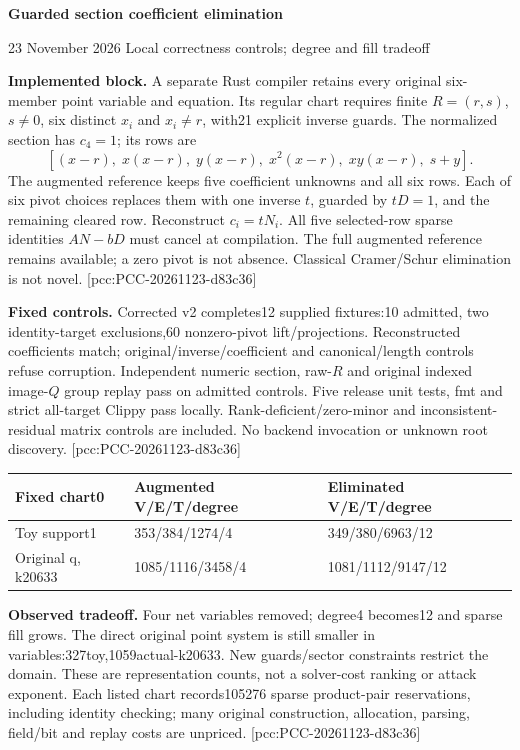 \documentclass[10pt]{article}
\begin{document}
{\Large\bfseries\color{ink} Guarded section coefficient elimination}\par
{\small 23 November 2026 \quad Local correctness controls; degree and fill tradeoff}

\textbf{Implemented block.} A separate Rust compiler retains every original
six-member point variable and equation. Its regular chart requires finite
$R=(r,s)$, $s\ne0$, six distinct $x_i$ and $x_i\ne r$, with21 explicit inverse
guards. The normalized section has $c_4=1$; its rows are
\[
[(x-r),\;x(x-r),\;y(x-r),\;x^2(x-r),\;xy(x-r),\;s+y].
\]
The augmented reference keeps five coefficient unknowns and all six rows.
Each of six pivot choices replaces them with one inverse $t$, guarded by
$tD=1$, and the remaining cleared row. Reconstruct $c_i=tN_i$. All five
selected-row sparse identities $AN-bD$ must cancel at compilation. The full
augmented reference remains available; a zero pivot is not absence.
Classical Cramer/Schur elimination is not novel. [pcc:PCC-20261123-d83c36]

\textbf{Fixed controls.} Corrected v2 completes12 supplied fixtures:10 admitted,
two identity-target exclusions,60 nonzero-pivot lift/projections. Reconstructed
coefficients match; original/inverse/coefficient and canonical/length controls
refuse corruption. Independent numeric section, raw-$R$ and original indexed
image-$Q$ group replay pass on admitted controls. Five release unit tests,
fmt and strict all-target Clippy pass locally. Rank-deficient/zero-minor and
inconsistent-residual matrix controls are included. No backend invocation or
unknown root discovery. [pcc:PCC-20261123-d83c36]

\begin{center}
\begin{tabular}{lll}
\toprule Fixed chart0 & Augmented V/E/T/degree & Eliminated V/E/T/degree\\\midrule
Toy support1 &353/384/1274/4&349/380/6963/12\\
Original q, k20633 &1085/1116/3458/4&1081/1112/9147/12\\\bottomrule
\end{tabular}
\end{center}
\textbf{Observed tradeoff.} Four net variables removed; degree4 becomes12 and
sparse fill grows. The direct original point system is still smaller in
variables:327toy,1059actual-k20633. New guards/sector constraints restrict the
domain. These are representation counts, not a solver-cost ranking or attack
exponent. Each listed chart records105276 sparse product-pair reservations,
including identity checking; many original construction, allocation, parsing,
field/bit and replay costs are unpriced. [pcc:PCC-20261123-d83c36]
\end{document}
